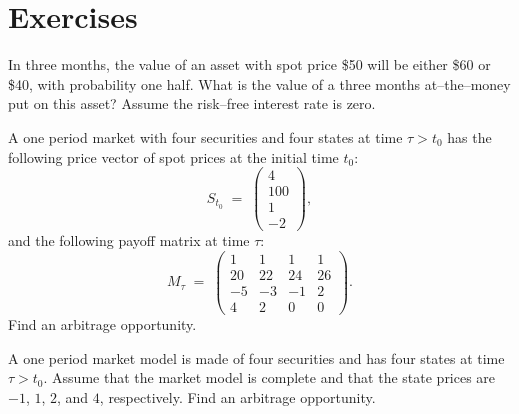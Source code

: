 
\section{Exercises}

\begin{exercises}

\item In three months, the value of an asset with spot price \$50 will be
either \$60 or \$40, with probability one half. What is the value of a
three months at--the--money put on this asset? Assume the risk--free
interest rate is zero.

\item A one period market with four securities and four states at time
$\tau > t_0$ has the following price vector of spot prices at the initial
time $t_0$:
\[
S_{t_0} \;=\; \begin{pmatrix} 4\\ 100\\ 1\\ -2\end{pmatrix},
\]
and the following payoff matrix at time $\tau$:
\[
M_\tau \;=\; \begin{pmatrix} 1 & 1 & 1 & 1\\ 20 & 22 & 24 & 26\\ -5 & -3 & -1 & 2\\ 4 & 2 & 0 & 0\end{pmatrix}.
\]
Find an arbitrage opportunity.

\item A one period market model is made of four securities and has four
states at time $\tau > t_0$. Assume that the market model is complete and
that the state prices are $-1$, $1$, $2$, and $4$, respectively. Find an
arbitrage opportunity.


\end{exercises}
